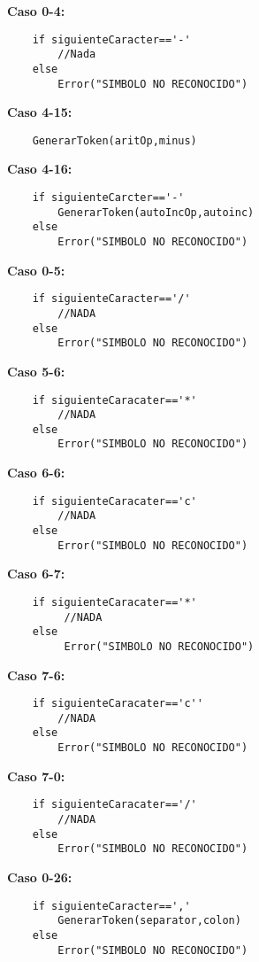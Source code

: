\documentclass{article}
\begin{document}
\textbf{Caso 0-4:}
\begin{verbatim}
    if siguienteCaracter=='-'
        //Nada
    else
        Error("SIMBOLO NO RECONOCIDO")
\end{verbatim}

\textbf{Caso 4-15:}
\begin{verbatim}
    GenerarToken(aritOp,minus)
\end{verbatim}

\textbf{Caso 4-16:}
\begin{verbatim}
    if siguienteCarcter=='-'
        GenerarToken(autoIncOp,autoinc)
    else 
        Error("SIMBOLO NO RECONOCIDO")
\end{verbatim}

\textbf{Caso 0-5:}
\begin{verbatim}
    if siguienteCaracter=='/'
        //NADA
    else
        Error("SIMBOLO NO RECONOCIDO")
\end{verbatim}

\textbf{Caso 5-6:}
\begin{verbatim}
    if siguienteCaracater=='*'
        //NADA
    else
        Error("SIMBOLO NO RECONOCIDO")
\end{verbatim}

\textbf{Caso 6-6:}
\begin{verbatim}
    if siguienteCaracater=='c'
        //NADA
    else
        Error("SIMBOLO NO RECONOCIDO")
\end{verbatim}

\textbf{Caso 6-7:}
\begin{verbatim}
    if siguienteCaracater=='*'
         //NADA
    else
         Error("SIMBOLO NO RECONOCIDO")
\end{verbatim}

\textbf{Caso 7-6:}
\begin{verbatim}
    if siguienteCaracater=='c''
        //NADA
    else
        Error("SIMBOLO NO RECONOCIDO")
\end{verbatim}

\textbf{Caso 7-0:}
\begin{verbatim}
    if siguienteCaracater=='/'
        //NADA
    else
        Error("SIMBOLO NO RECONOCIDO")
\end{verbatim}

\textbf{Caso 0-26:}
\begin{verbatim}
    if siguienteCaracter==','
        GenerarToken(separator,colon)
    else
        Error("SIMBOLO NO RECONOCIDO")
\end{verbatim}
\end{document}

